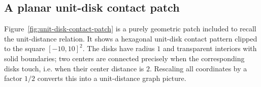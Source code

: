 \documentclass[a4paper,12pt]{article}
\begin{document}
\subsection{A planar unit-disk contact patch}

Figure~\ref{fig:unit-disk-contact-patch} is a purely geometric patch included to recall the unit-distance relation.  It shows a hexagonal unit-disk contact pattern clipped to the square $[-10,10]^2$.  The disks have radius $1$ and transparent interiors with solid boundaries; two centers are connected precisely when the corresponding disks touch, i.e. when their center distance is $2$.  Rescaling all coordinates by a factor $1/2$ converts this into a unit-distance graph picture.

\begin{figure}[htbp]
\centering
{}
\end{figure}
\end{document}
